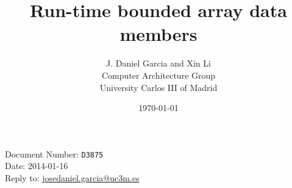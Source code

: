 \documentclass[10pt,a4paper,oneside,final,notitlepage]{article}%
\begin{document}
\begin{flushright}
Document Number: \texttt{D3875}\\
Date: 2014-01-16\\
Reply to: \url{josedaniel.garcia@uc3m.es}
\end{flushright}

\title{Run-time bounded array data members}
\author{J. Daniel Garcia and Xin Li\\
Computer Architecture Group\\
University Carlos III of Madrid
}
\date{\today}

\begingroup
\let\newpage\relax%
\maketitle
\endgroup







\end{document}
